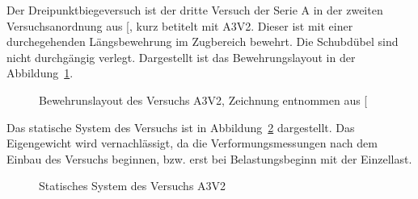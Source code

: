 \documentclass[
  11pt,
  letterpaper,
]{scrreprt}
\begin{document}
Der Dreipunktbiegeversuch ist der dritte Versuch der Serie A in der
zweiten Versuchsanordnung aus
{[}\citeproc{ref-jager_versuche_2006}{2}{]}, kurz betitelt mit A3V2.
Dieser ist mit einer durchegehenden Längsbewehrung im Zugbereich
bewehrt. Die Schubdübel sind nicht durchgängig verlegt. Dargestellt ist
das Bewehrungslayout in der Abbildung~\ref{fig-bewehrung_a3v2}.

\begin{figure}[H]


\caption{\label{fig-bewehrung_a3v2}Bewehrunslayout des Versuchs A3V2,
Zeichnung entnommen aus {[}\citeproc{ref-jager_versuche_2006}{2}{]}}

\end{figure}%

Das statische System des Versuchs ist in Abbildung~\ref{fig-system_a3v2}
dargestellt. Das Eigengewicht wird vernachlässigt, da die
Verformungsmessungen nach dem Einbau des Versuchs beginnen, bzw. erst
bei Belastungsbeginn mit der Einzellast.

\begin{figure}[H]


\caption{\label{fig-system_a3v2}Statisches System des Versuchs A3V2}

\end{figure}%
\end{document}
